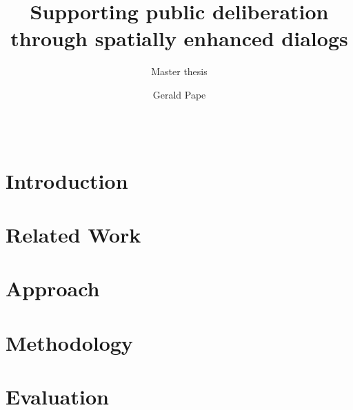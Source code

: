 \documentclass{sigchi}
\begin{document}
\title{Supporting public deliberation\\through spatially enhanced dialogs}
\subtitle{Master thesis}

\author{
  \alignauthor Gerald Pape\\
    \\
    \\
}

\maketitle





\section{Introduction}


\section{Related Work}

    
    
\section{Approach}

    
\section{Methodology}

    
    
\section{Evaluation}

    
\end{document}
